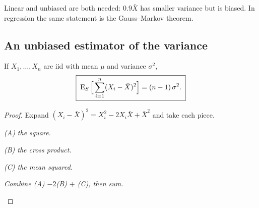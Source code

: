 Linear and unbiased are both needed: $0.9\bar X$ has smaller variance but is biased. In regression the same statement is the Gauss--Markov theorem.

\subsection*{An unbiased estimator of the variance}

\begin{theorem}
If $X_1,\dots,X_n$ are iid with mean $\mu$ and variance $\sigma^2$,
\[
  \boxed{\;\operatorname{E}_S\Big[\sum_{i=1}^n(X_i-\bar X)^2\Big]=(n-1)\,\sigma^2.\;}
\]
\end{theorem}
\begin{proof}
Expand $(X_i-\bar X)^2=X_i^2-2X_i\bar X+\bar X^2$ and take each piece.
\begin{steps}
  \item \emph{(A) the square.}
  \begin{deriv}
  \end{deriv}
  \item \emph{(B) the cross product.}
  \begin{deriv}
  \end{deriv}
  \item \emph{(C) the mean squared.}
  \begin{deriv}
  \end{deriv}
  \item \emph{Combine (A) $-2$(B) $+$ (C), then sum.}
  \begin{deriv}
  \end{deriv}
\end{steps}
\end{proof}

